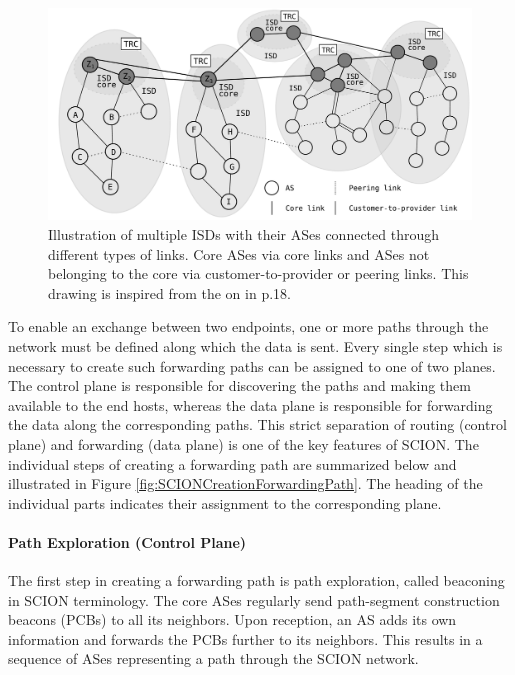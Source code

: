 \begin{figure}
	\begin{center}
		\def\svgwidth{1\textwidth}
		\includegraphics[scale=0.24]{../illustrations/importantConcepts/SCIONISDsAndASes.pdf} 
		\caption[Caption for the list of figures.]{Illustration of multiple ISDs with their ASes connected through different types of links. Core ASes via core links and ASes not belonging to the core via customer-to-provider or peering links. This drawing is inspired from the on in \cite{SCIONBook} p.18.}
		\label{fig:SCIONArchitectureISDs}
	\end{center}
\end{figure}

To enable an exchange between two endpoints, one or more paths through the network must be defined along which the data is sent. Every single step which is necessary to create such forwarding paths can be assigned to one of two planes. The control plane is responsible for discovering the paths and making them available to the end hosts, whereas the data plane is responsible for forwarding the data along the corresponding paths. This strict separation of routing (control plane) and forwarding (data plane) is one of the key features of SCION. The individual steps of creating a forwarding path are summarized below and illustrated in Figure \ref{fig:SCIONCreationForwardingPath}. The heading of the individual parts indicates their assignment to the corresponding plane.

\paragraph{Path Exploration (Control Plane)}

The first step in creating a forwarding path is path exploration, called beaconing in SCION terminology. The core ASes regularly send path-segment construction beacons (PCBs) to all its neighbors. Upon reception, an AS adds its own information and forwards the PCBs further to its neighbors. This results in a sequence of ASes representing a path through the SCION network. 

